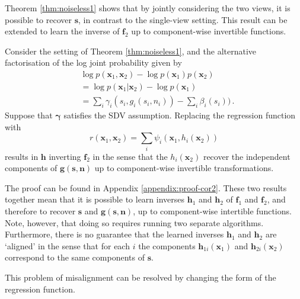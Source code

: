 Theorem \ref{thm:noiseless1} shows that by jointly considering the two views, it is possible to recover $\bm{s}$, in contrast to the single-view setting.
This result can be extended to learn the inverse of $\bm{f}_2$ up to component-wise invertible functions.

\medskip

\begin{corollary}
	\label{crl:noiseless1}
	Consider the setting of Theorem \ref{thm:noiseless1}, and the alternative factorisation of the log joint probability given by
	\begin{align}
	&\log p(\bm{x}_1, \bm{x}_2) - \log p(\bm{x}_1) p(\bm{x}_2) \nonumber \\
	&= \log p(\bm{x}_1 | \bm{x}_2) - \log p(\bm{x}_1)\nonumber \\
	&= \sum_i \gamma_i(s_{i}, g_i(s_i, n_i)) - \sum_i \beta_i(s_i)) \label{eq:logdens_noiesless_2}\,.
	\end{align}
	Suppose that $\bm{\gamma}$ satisfies the SDV assumption.
	Replacing the regression function with
	\begin{equation*}
	r(\bm{x}_{1},\bm{x}_{2})=\sum_{i}\psi_{i}(\bm{x}_{1}, h_{i}(\bm{x}_{2}))
	\end{equation*}
	results in $\bm{h}$ inverting $\bm{f}_2$ in the sense that the $h_{i}(\bm{x}_2)$ recover the independent components of $\bm{g}(\bm{s}, \bm{n})$ up  to component-wise invertible transformations.
\end{corollary}The proof can be found in Appendix \ref{appendix:proof-cor2}.
These two results together mean that it is possible to learn inverses $\bm{h}_1$ and $\bm{h}_2$ of $\bm{f}_1$ and $\bm{f}_2$, and therefore to recover $\bm{s}$ and $\bm{g}(\bm{s}, \bm{n})$, up to component-wise intertible functions.
Note, however, that doing so requires running two separate algorithms.
Furthermore, there is no guarantee that the learned inverses $\bm{h}_1$ and $\bm{h}_2$ are `aligned' in the sense that for each $i$ the components $\bm{h}_{1i}(\bm{x}_1)$ and $\bm{h}_{2i}(\bm{x}_2)$ correspond to the same components of $\bm{s}$.

This problem of misalignment can be resolved by changing the form of the regression function.

\medskip

